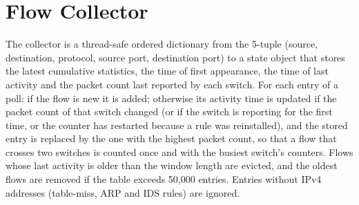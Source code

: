 \section{Flow Collector}
The collector is a thread-safe ordered dictionary from the 5-tuple (source, destination, protocol, source port, destination port) to a state object that stores the latest cumulative statistics, the time of first appearance, the time of last activity and the packet count last reported by each switch. For each entry of a poll: if the flow is new it is added; otherwise its activity time is updated if the packet count of that switch changed (or if the switch is reporting for the first time, or the counter has restarted because a rule was reinstalled), and the stored entry is replaced by the one with the highest packet count, so that a flow that crosses two switches is counted once and with the busiest switch's counters. Flows whose last activity is older than the window length are evicted, and the oldest flows are removed if the table exceeds 50,000 entries. Entries without IPv4 addresses (table-miss, ARP and IDS rules) are ignored.

